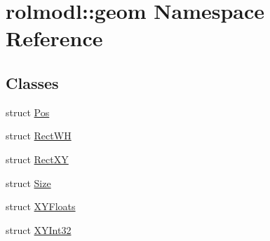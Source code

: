 \hypertarget{namespacerolmodl_1_1geom}{}\section{rolmodl\+::geom Namespace Reference}
\label{namespacerolmodl_1_1geom}
\subsection*{Classes}
\begin{DoxyCompactItemize}
\item 
struct \mbox{\hyperlink{structrolmodl_1_1geom_1_1_pos}{Pos}}
\item 
struct \mbox{\hyperlink{structrolmodl_1_1geom_1_1_rect_w_h}{Rect\+WH}}
\item 
struct \mbox{\hyperlink{structrolmodl_1_1geom_1_1_rect_x_y}{Rect\+XY}}
\item 
struct \mbox{\hyperlink{structrolmodl_1_1geom_1_1_size}{Size}}
\item 
struct \mbox{\hyperlink{structrolmodl_1_1geom_1_1_x_y_floats}{X\+Y\+Floats}}
\item 
struct \mbox{\hyperlink{structrolmodl_1_1geom_1_1_x_y_int32}{X\+Y\+Int32}}
\end{DoxyCompactItemize}
